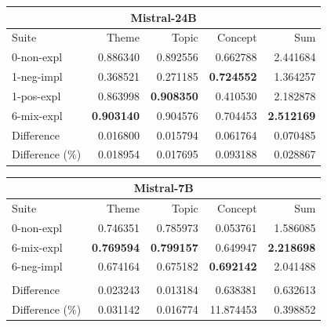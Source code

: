 \begin{table}
    \begin{tabular}{lrrrr}
    \toprule
    \multicolumn{5}{c}{\textbf{Mistral-24B}} \\
    \midrule
    Suite & Theme & Topic & Concept & Sum \\
    \midrule
    0-non-expl & 0.886340 & 0.892556 & 0.662788 & 2.441684 \\
    1-neg-impl & 0.368521 & 0.271185 & \bfseries 0.724552 & 1.364257 \\
    1-pos-expl & 0.863998 & \bfseries 0.908350 & 0.410530 & 2.182878 \\
    6-mix-expl & \bfseries 0.903140 & 0.904576 & 0.704453 & \bfseries 2.512169 \\
    \midrule
    Difference & 0.016800 & 0.015794 & 0.061764 & 0.070485 \\
    Difference (\%) & 0.018954 & 0.017695 & 0.093188 & 0.028867 \\
    \bottomrule
    \end{tabular}
    \quad
    \begin{tabular}{lrrrr}
    \toprule
    \multicolumn{5}{c}{\textbf{Mistral-7B}} \\
    \midrule
    Suite & Theme & Topic & Concept & Sum \\
    \midrule
    0-non-expl & 0.746351 & 0.785973 & 0.053761 & 1.586085 \\
    6-mix-expl & \bfseries 0.769594 & \bfseries 0.799157 & 0.649947 & \bfseries 2.218698 \\
    6-neg-impl & 0.674164 & 0.675182 & \bfseries 0.692142 & 2.041488 \\
    & & & & \\
    \midrule
    Difference & 0.023243 & 0.013184 & 0.638381 & 0.632613 \\
    Difference (\%) & 0.031142 & 0.016774 & 11.874453 & 0.398852 \\
    \bottomrule
    \end{tabular}

    \quad
    

\end{table}
